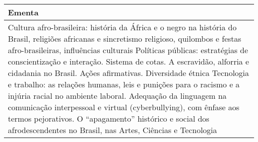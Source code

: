 \begin{quadro}[ht!]
\begin{tabular}{|p{3cm} p{2cm} p{3cm} p{2cm} p{3cm} p{2cm}|}
\multicolumn{6}{|p{15cm}|}{\cellcolor{blue1} Ementa} \\\hline
\hline\multicolumn{6}{|p{15cm}|}{\scriptsize Cultura afro-brasileira: história da África e o negro na história do Brasil, religiões africanas e sincretismo religioso, quilombos e festas afro-brasileiras, influências culturais Políticas públicas: estratégias de conscientização e interação. Sistema de cotas. A escravidão, alforria e cidadania no Brasil. Ações afirmativas. Diversidade étnica Tecnologia e trabalho:  as relações humanas, leis e punições para o racismo e a injúria racial no ambiente laboral. Adequação da linguagem na comunicação interpessoal e virtual (cyberbullying), com ênfase   aos termos pejorativos. O ``apagamento'' histórico e social dos afrodescendentes no Brasil, nas Artes, Ciências e Tecnologia}\\\hline
\hline
	\end{tabular}
\end{quadro}
